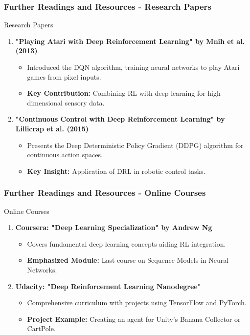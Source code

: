 \documentclass[aspectratio=169]{beamer}
\begin{document}
\begin{frame}[fragile]
  \frametitle{Further Readings and Resources - Research Papers}
  \begin{block}{Research Papers}
    \begin{enumerate}
      \item \textbf{"Playing Atari with Deep Reinforcement Learning" by Mnih et al. (2013)}
        \begin{itemize}
          \item Introduced the DQN algorithm, training neural networks to play Atari games from pixel inputs.
          \item \textbf{Key Contribution:} Combining RL with deep learning for high-dimensional sensory data.
        \end{itemize}

      \item \textbf{"Continuous Control with Deep Reinforcement Learning" by Lillicrap et al. (2015)}
        \begin{itemize}
          \item Presents the Deep Deterministic Policy Gradient (DDPG) algorithm for continuous action spaces.
          \item \textbf{Key Insight:} Application of DRL in robotic control tasks.
        \end{itemize}
    \end{enumerate}
  \end{block}
\end{frame}

\begin{frame}[fragile]
  \frametitle{Further Readings and Resources - Online Courses}
  \begin{block}{Online Courses}
    \begin{enumerate}
      \item \textbf{Coursera: "Deep Learning Specialization" by Andrew Ng}
        \begin{itemize}
          \item Covers fundamental deep learning concepts aiding RL integration.
          \item \textbf{Emphasized Module:} Last course on Sequence Models in Neural Networks.
        \end{itemize}

      \item \textbf{Udacity: "Deep Reinforcement Learning Nanodegree"}
        \begin{itemize}
          \item Comprehensive curriculum with projects using TensorFlow and PyTorch.
          \item \textbf{Project Example:} Creating an agent for Unity's Banana Collector or CartPole.
        \end{itemize}
    \end{enumerate}
  \end{block}
\end{frame}
\end{document}
